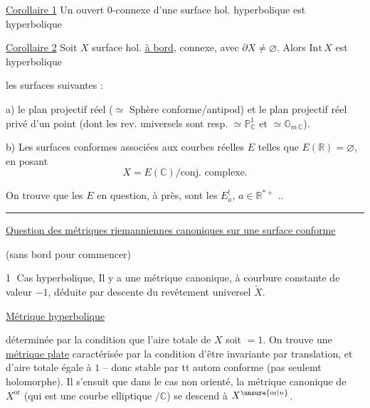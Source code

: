 \uline{Corollaire 1} Un ouvert $0$-connexe d'une surface hol. hyperbolique est hyperbolique

\uline{Corollaire 2} Soit $X$ surface hol. \uline{à bord},  connexe, avec $\partial X\neq\varnothing$. Alors $\mathrm{Int}\,X$ est hyperbolique


les surfaces suivantes :

a) le plan projectif réel ($\simeq$ Sphère conforme/antipod) et le plan projectif réel privé d'un point (dont les rev. universels sont resp. $\simeq\mathbb P^1_{\mathbb C}$ et $\simeq\mathbb G_{m\,\mathbb C}$).

b) Les surfaces conformes associées aux courbes  réelles $E$  telles que $E(\mathbb R)=\varnothing$, en posant 
\[
X=E(\mathbb C)/\text{conj. complexe}.
\]

On trouve que les $E$ en question, à  près, sont les $E_a^{!}$, $a\in\mathbb R^{*+}$ ..

\noindent\rule{\linewidth}{.35pt}

\uline{Question des métriques riemanniennes canoniques sur une surface conforme}

(sans bord pour commencer)

\textcircled{1} Cas hyperbolique, Il y a une métrique canonique, à courbure constante de valeur $-1$, déduite par descente du revêtement universel $\widetilde X$.

\uline{Métrique hyperbolique}


déterminée par la condition que l'aire totale de $X$ soit $=1$. On trouve une \uline{métrique plate} caractérisée par la condition d'être invariante par translation, et d'aire  totale égale à $1$ -- donc stable par tt autom conforme (pas seulemt holomorphe). Il s'ensuit que dans le cas non orienté, la métrique canonique de $X^{\mathrm{or}}$ (qui est une courbe elliptique $/\mathbb C$) se descend à $X^{\unsure{\mathrm{or}|n}}$.

